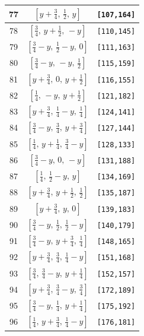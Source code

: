 \documentclass[fleqn,8pt]{jsarticle}
\begin{document}
\begin{longtable}{ccc}
77 & $\left[ y + \frac{3}{4},\, \frac{1}{2},\, y \right]$ & {\tt [107,164]} \\ \hline
78 & $\left[ \frac{3}{4},\, y + \frac{1}{2},\, - y \right]$ & {\tt [110,145]} \\ \hline
79 & $\left[ \frac{3}{4} - y,\, \frac{1}{2} - y,\, 0 \right]$ & {\tt [111,163]} \\ \hline
80 & $\left[ \frac{3}{4} - y,\, - y,\, \frac{1}{2} \right]$ & {\tt [115,159]} \\ \hline
81 & $\left[ y + \frac{3}{4},\, 0,\, y + \frac{1}{2} \right]$ & {\tt [116,155]} \\ \hline
82 & $\left[ \frac{1}{4},\, - y,\, y + \frac{1}{2} \right]$ & {\tt [121,182]} \\ \hline
83 & $\left[ y + \frac{3}{4},\, \frac{1}{4} - y,\, \frac{1}{4} \right]$ & {\tt [124,141]} \\ \hline
84 & $\left[ \frac{3}{4} - y,\, \frac{3}{4},\, y + \frac{3}{4} \right]$ & {\tt [127,144]} \\ \hline
85 & $\left[ \frac{1}{4},\, y + \frac{1}{4},\, \frac{3}{4} - y \right]$ & {\tt [128,133]} \\ \hline
86 & $\left[ \frac{3}{4} - y,\, 0,\, - y \right]$ & {\tt [131,188]} \\ \hline
87 & $\left[ \frac{1}{4},\, \frac{1}{2} - y,\, y \right]$ & {\tt [134,169]} \\ \hline
88 & $\left[ y + \frac{3}{4},\, y + \frac{1}{2},\, \frac{1}{2} \right]$ & {\tt [135,187]} \\ \hline
89 & $\left[ y + \frac{3}{4},\, y,\, 0 \right]$ & {\tt [139,183]} \\ \hline
90 & $\left[ \frac{3}{4} - y,\, \frac{1}{2},\, \frac{1}{2} - y \right]$ & {\tt [140,179]} \\ \hline
91 & $\left[ \frac{3}{4} - y,\, y + \frac{3}{4},\, \frac{1}{4} \right]$ & {\tt [148,165]} \\ \hline
92 & $\left[ y + \frac{3}{4},\, \frac{3}{4},\, \frac{1}{4} - y \right]$ & {\tt [151,168]} \\ \hline
93 & $\left[ \frac{3}{4},\, \frac{3}{4} - y,\, y + \frac{1}{4} \right]$ & {\tt [152,157]} \\ \hline
94 & $\left[ y + \frac{3}{4},\, \frac{3}{4} - y,\, \frac{3}{4} \right]$ & {\tt [172,189]} \\ \hline
95 & $\left[ \frac{3}{4} - y,\, \frac{1}{4},\, y + \frac{1}{4} \right]$ & {\tt [175,192]} \\ \hline
96 & $\left[ \frac{1}{4},\, y + \frac{3}{4},\, \frac{1}{4} - y \right]$ & {\tt [176,181]} \\
\end{longtable}
\end{document}
